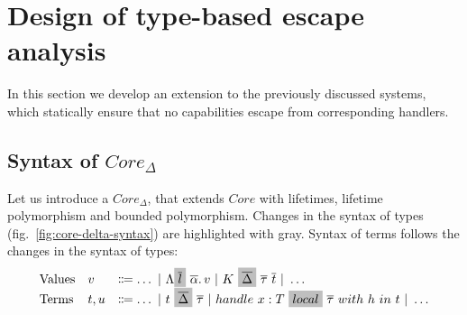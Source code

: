\documentclass[acmsmall]{acmart}
\newcommand{\graybox}[1]{\colorbox{lightgray}{$\displaystyle #1$}}
\newcommand{\vor}{~|~}
\newcommand{\ap}{~}
\begin{document}




\section{Design of type-based escape analysis} \label{sec:escape}

In this section we develop an extension to the previously discussed systems, which statically ensure that no capabilities escape from corresponding handlers.


\subsection{Syntax of $Core_\Delta$}

Let us introduce a $Core_\Delta$, that extends $Core$ with lifetimes, lifetime polymorphism and bounded polymorphism.
Changes in the syntax of types (fig.\ \ref{fig:core-delta-syntax}) are highlighted with gray.
Syntax of terms follows the changes in the syntax of types:
\[
    \begin{array}{lll}
        \text{Values} & v & \Coloneqq \ldots \vor \Lambda \graybox{\overline{l}}\ap\overline{\alpha}\ldotp v \vor K\ap\graybox{\overline{\Delta}}\ap\overline{\tau}\ap\overline{t} \vor \ldots \\
        \text{Terms} & t, u &\Coloneqq \ldots \vor t\ap\graybox{\overline{\Delta}}\ap\overline{\tau} \vor handle ~ x : T \ap\graybox{local}\ap \overline{\tau} ~with ~h~in ~t \vor \ldots
    \end{array}
\]
\end{document}
